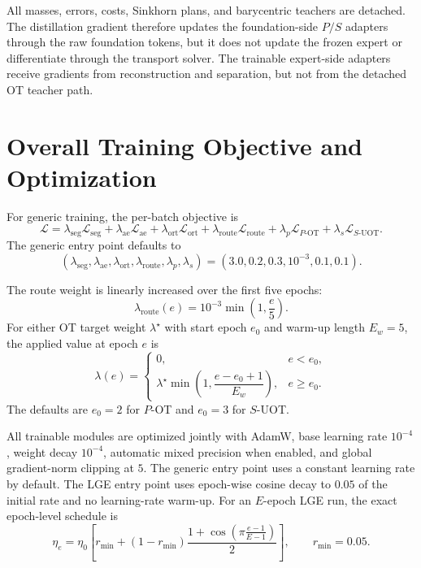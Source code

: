 \documentclass[10pt]{article}
\newcommand{\cL}{\mathcal{L}}
\begin{document}
All masses, errors, costs, Sinkhorn plans, and barycentric teachers are detached.
The distillation gradient therefore updates the foundation-side $P/S$ adapters
through the raw foundation tokens, but it does not update the frozen expert or
differentiate through the transport solver.  The trainable expert-side adapters
receive gradients from reconstruction and separation, but not from the detached
OT teacher path.

\section{Overall Training Objective and Optimization}


For generic training, the per-batch objective is
\begin{equation}
    \cL
    =\lambda_{\mathrm{seg}}\cL_{\mathrm{seg}}
     +\lambda_{\mathrm{ae}}\cL_{\mathrm{ae}}
     +\lambda_{\mathrm{ort}}\cL_{\mathrm{ort}}
     +\lambda_{\mathrm{route}}\cL_{\mathrm{route}}
     +\lambda_p\cL_{P\text{-OT}}
     +\lambda_s\cL_{S\text{-UOT}}.
    \label{eq:overall-objective}
\end{equation}
The generic entry point defaults to
\begin{equation}
    (\lambda_{\mathrm{seg}},\lambda_{\mathrm{ae}},
     \lambda_{\mathrm{ort}},\lambda_{\mathrm{route}},
     \lambda_p,\lambda_s)
    =(3.0,0.2,0.3,10^{-3},0.1,0.1).
\end{equation}

The route weight is linearly increased over the first five epochs:
\begin{equation}
    \lambda_{\mathrm{route}}(e)
    =10^{-3}\min\!\left(1,\frac{e}{5}\right).
    \label{eq:route-schedule}
\end{equation}
For either OT target weight $\lambda^\star$ with start epoch $e_0$ and warm-up
length $E_w=5$, the applied value at epoch $e$ is
\begin{equation}
    \lambda(e)=
    \begin{cases}
      0,&e<e_0,\\
      \lambda^\star\min\!\left(1,
      \dfrac{e-e_0+1}{E_w}\right),&e\geq e_0.
    \end{cases}
    \label{eq:ot-schedule}
\end{equation}
The defaults are $e_0=2$ for $P$-OT and $e_0=3$ for $S$-UOT.

All trainable modules are optimized jointly with AdamW, base learning rate
$10^{-4}$, weight decay $10^{-4}$, automatic mixed precision when enabled, and
global gradient-norm clipping at $5$.  The generic entry point uses a constant
learning rate by default.  The LGE entry point uses epoch-wise cosine decay to
$0.05$ of the initial rate and no learning-rate warm-up.  For an $E$-epoch LGE
run, the exact epoch-level schedule is
\begin{equation}
    \eta_e=\eta_0\left[
      r_{\min}+(1-r_{\min})
      \frac{1+\cos\!\left(\pi\frac{e-1}{E-1}\right)}{2}
      \right],
    \qquad r_{\min}=0.05.
    \label{eq:lge-cosine-lr}
\end{equation}
\end{document}
